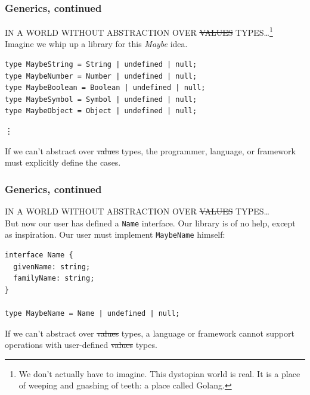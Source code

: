 \documentclass[aspectratio=169]{beamer}
\begin{document}
\begin{frame}[fragile]
  \frametitle{Generics, continued}
  IN A WORLD WITHOUT ABSTRACTION OVER \sout{VALUES} TYPES\ldots\footnote{We
    don't actually have to imagine. This dystopian world is real. It is a
    place of weeping and gnashing of teeth: a place called Golang.} \\

  Imagine we whip up a library for this \textit{Maybe} idea.

  \begin{verbatim}
type MaybeString = String | undefined | null;
type MaybeNumber = Number | undefined | null;
type MaybeBoolean = Boolean | undefined | null;
type MaybeSymbol = Symbol | undefined | null;
type MaybeObject = Object | undefined | null;
  \end{verbatim}
  \vdots

  \vspace{1em}

  \begin{tcolorbox}
    If we can't abstract over \sout{values} types, the programmer, language,
    or framework must explicitly define the cases.
  \end{tcolorbox}

\end{frame}

\begin{frame}[fragile]
  \frametitle{Generics, continued}
  \small
  IN A WORLD WITHOUT ABSTRACTION OVER \sout{VALUES} TYPES\ldots \\

  But now our user has defined a \texttt{Name} interface. Our library is of
  no help, except as inspiration. Our user must implement \texttt{MaybeName}
  himself: \\

  \begin{verbatim}
interface Name {
  givenName: string;
  familyName: string;
}

type MaybeName = Name | undefined | null;
  \end{verbatim}

  \vspace{1em}

  \begin{tcolorbox}
    If we can't abstract over \sout{values} types, a language or framework
    cannot support operations with user-defined \sout{values} types.
  \end{tcolorbox}
\end{frame}
\end{document}
